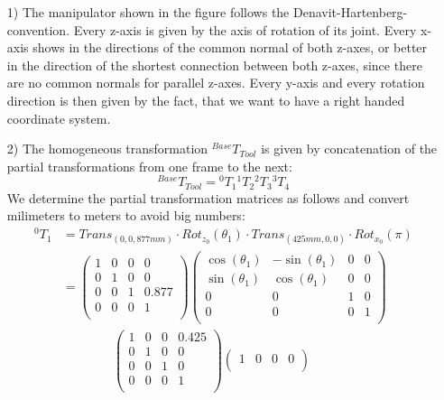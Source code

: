 \documentclass[a4paper,11pt]{article}
\begin{document}
\begin {enumerate}
    \begin{enumerate}
        \item[1)] The manipulator shown in the figure follows the Denavit-Hartenberg-convention. Every z-axis is given by the axis of rotation of its joint. Every x-axis shows in the directions of the common normal of both z-axes, or better in the direction of the shortest connection between both z-axes, since there are no common normals for parallel z-axes. Every y-axis and every rotation direction is then given by the fact, that we want to have a right handed coordinate system.
        \item[2)] The homogeneous transformation $^{Base}T_{Tool}$ is given by concatenation of the partial transformations from one frame to the next:
        $${^{Base}T_{Tool}} = {^0T_1}{^1T_2}{^2T_3}{^3T_4}$$
        We determine the partial transformation matrices as follows and convert milimeters to meters to avoid big numbers:
        \begin{align*}
        	{^0T_1} &= Trans_{(0,0,877mm)} \cdot Rot_{z_0}(\theta_1) \cdot Trans_{(425mm,0,0)} \cdot Rot_{x_0}(\pi)\\
        	&= \begin{pmatrix}
        		1 & 0 & 0 & 0\\
        		0 & 1 & 0 & 0\\
        		0 & 0 & 1 & 0.877\\
        		0 & 0 & 0 & 1\\
        	\end{pmatrix}        	
        	\begin{pmatrix}
        		\cos(\theta_1) & -\sin(\theta_1) & 0 & 0\\
        		\sin(\theta_1) & \cos(\theta_1) & 0 & 0\\
        		0 & 0 & 1 & 0\\
        		0 & 0 & 0 & 1\\
        	\end{pmatrix}\\
        	&\qquad\qquad \begin{pmatrix}
        		1 & 0 & 0 & 0.425\\
        		0 & 1 & 0 & 0\\
        		0 & 0 & 1 & 0\\
        		0 & 0 & 0 & 1\\
        	\end{pmatrix}
        	\begin{pmatrix}
        	    1 & 0 & 0 & 0\\

\end{pmatrix}
\end{align*}
\end{enumerate}
\end{enumerate}
\end{document}
